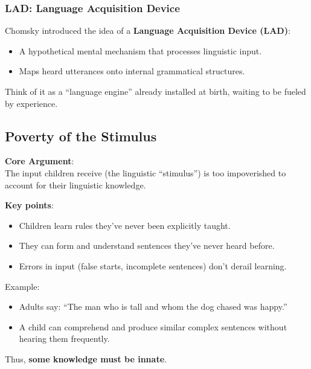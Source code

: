 \documentclass[12pt]{article}
\newcommand{\tightlist}{\itemsep 0pt\parskip 0pt\parsep 0pt}
\begin{document}
\hypertarget{lad-language-acquisition-device}{%
\subsubsection{LAD: Language Acquisition
Device}\label{lad-language-acquisition-device}}

Chomsky introduced the idea of a \textbf{Language Acquisition Device
(LAD)}:

\begin{itemize}
\tightlist
\item
  A hypothetical mental mechanism that processes linguistic input.
\item
  Maps heard utterances onto internal grammatical structures.
\end{itemize}

Think of it as a ``language engine'' already installed at birth, waiting
to be fueled by experience.

\hypertarget{poverty-of-the-stimulus}{%
\subsection{Poverty of the Stimulus}\label{poverty-of-the-stimulus}}

\textbf{Core Argument}:\\
The input children receive (the linguistic ``stimulus'') is too
impoverished to account for their linguistic knowledge.

\textbf{Key points}:

\begin{itemize}
\tightlist
\item
  Children learn rules they've never been explicitly taught.
\item
  They can form and understand sentences they've never heard before.
\item
  Errors in input (false starts, incomplete sentences) don't derail
  learning.
\end{itemize}

Example:

\begin{itemize}
\tightlist
\item
  Adults say: ``The man who is tall and whom the dog chased was happy.''
\item
  A child can comprehend and produce similar complex sentences without
  hearing them frequently.
\end{itemize}

Thus, \textbf{some knowledge must be innate}.
\end{document}
